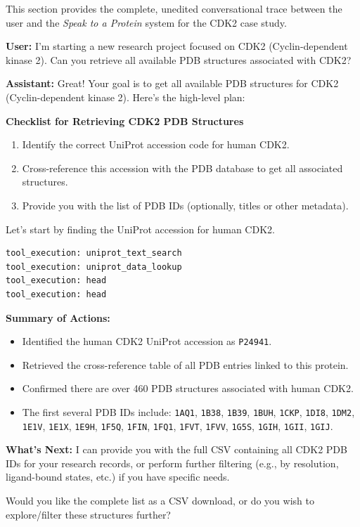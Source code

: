 \documentclass{article}
\begin{document}
This section provides the complete, unedited conversational trace between the user and the \emph{Speak to a Protein} system for the CDK2 case study.

\vspace{1em}

\begin{userbox}
\textbf{User:} I'm starting a new research project focused on CDK2 (Cyclin-dependent kinase 2). Can you retrieve all available PDB structures associated with CDK2?
\end{userbox}

\begin{assistantbox}
\textbf{Assistant:} Great! Your goal is to get all available PDB structures for CDK2 (Cyclin-dependent kinase 2). Here's the high-level plan:

\textbf{Checklist for Retrieving CDK2 PDB Structures}
\begin{enumerate}
    \item Identify the correct UniProt accession code for human CDK2.
    \item Cross-reference this accession with the PDB database to get all associated structures.
    \item Provide you with the list of PDB IDs (optionally, titles or other metadata).
\end{enumerate}

Let's start by finding the UniProt accession for human CDK2.
\begin{verbatim}
tool_execution: uniprot_text_search
tool_execution: uniprot_data_lookup
tool_execution: head
tool_execution: head
\end{verbatim}
\textbf{Summary of Actions:}
\begin{itemize}
    \item Identified the human CDK2 UniProt accession as \texttt{P24941}.
    \item Retrieved the cross-reference table of all PDB entries linked to this protein.
    \item Confirmed there are over 460 PDB structures associated with human CDK2.
    \item The first several PDB IDs include: \texttt{1AQ1}, \texttt{1B38}, \texttt{1B39}, \texttt{1BUH}, \texttt{1CKP}, \texttt{1DI8}, \texttt{1DM2}, \texttt{1E1V}, \texttt{1E1X}, \texttt{1E9H}, \texttt{1F5Q}, \texttt{1FIN}, \texttt{1FQ1}, \texttt{1FVT}, \texttt{1FVV}, \texttt{1G5S}, \texttt{1GIH}, \texttt{1GII}, \texttt{1GIJ}.
\end{itemize}
\textbf{What's Next:} I can provide you with the full CSV containing all CDK2 PDB IDs for your research records, or perform further filtering (e.g., by resolution, ligand-bound states, etc.) if you have specific needs.

Would you like the complete list as a CSV download, or do you wish to explore/filter these structures further?
\end{assistantbox}
\end{document}
